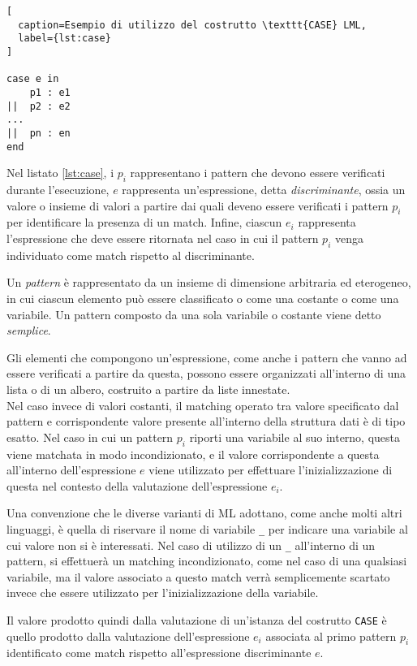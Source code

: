 \begin{lstlisting}[
  caption=Esempio di utilizzo del costrutto \texttt{CASE} LML,
  label={lst:case}
]

case e in
    p1 : e1
||  p2 : e2
...
||  pn : en
end

\end{lstlisting}

Nel listato \ref{lst:case}, i $p_i$ rappresentano i pattern che devono essere
verificati durante l'esecuzione, $e$ rappresenta un’espressione, detta
\textit{discriminante}, ossia un valore o insieme di valori a partire dai quali
deveno essere verificati i pattern $p_i$ per identificare la presenza di un
match. Infine, ciascun $e_i$ rappresenta l'espressione che deve essere ritornata
nel caso in cui il pattern $p_i$ venga individuato come match rispetto al
discriminante.

Un \textit{pattern} è rappresentato da un insieme di dimensione arbitraria ed
eterogeneo, in cui ciascun elemento può essere classificato o come una costante
o come una variabile. Un pattern composto da una sola variabile o costante viene
detto \textit{semplice}.

Gli elementi che compongono un'espressione, come anche i pattern che vanno ad
essere verificati a partire da questa, possono essere organizzati all’interno di
una lista o di un albero, costruito a partire da liste innestate.\\

Nel caso invece di valori costanti, il matching operato tra valore specificato
dal pattern e corrispondente valore presente all'interno della struttura dati è
di tipo esatto. Nel caso in cui un pattern $p_i$ riporti una variabile al suo
interno, questa viene matchata in modo incondizionato, e il valore
corrispondente a questa all’interno dell’espressione $e$ viene utilizzato per
effettuare l’inizializzazione di questa nel contesto della valutazione
dell'espressione $e_i$.

Una convenzione che le diverse varianti di ML adottano, come anche molti altri
linguaggi, è quella di riservare il nome di variabile \texttt{\_} per indicare
una variabile al cui valore non si è interessati. Nel caso di utilizzo di un
\texttt{\_} all’interno di un pattern, si effettuerà un matching incondizionato,
come nel caso di una qualsiasi variabile, ma il valore associato a questo match
verrà semplicemente scartato invece che essere utilizzato per l’inizializzazione
della variabile.

Il valore prodotto quindi dalla valutazione di un'istanza del costrutto
\texttt{CASE} è quello prodotto dalla valutazione dell’espressione $e_i$
associata al primo pattern $p_i$ identificato come match rispetto
all’espressione discriminante $e$.\\

